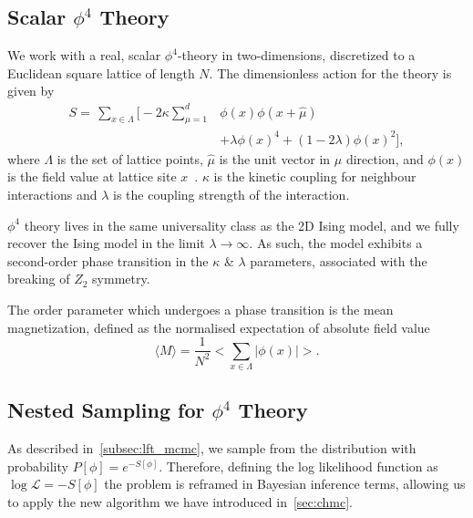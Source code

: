\documentclass[11pt]{article}
\begin{document}
\subsection{Scalar $\phi^4$ Theory}\label{subsec:phi^4_theory}
    We work with a real, scalar $\phi^4$-theory in two-dimensions, discretized to a Euclidean square lattice of length $N$.
    The dimensionless action for the theory is given by
    \begin{equation}\label{eq:phi4_action}
    \begin{aligned}
        S = \,\sum\limits_{x \in \Lambda} \Biggl[-2\kappa \sum\limits_{\mu=1}^d & \phi(x) \phi(x+\hat{\mu}) \\
        &+\lambda \phi(x)^4 + (1 - 2\lambda) \phi(x)^2 \Biggr],
    \end{aligned}
    \end{equation}
    where $\Lambda$ is the set of lattice points, $\hat{\mu}$ is the unit vector in $\mu$ direction, and $\phi(x)$ is
    the field value at lattice site $x$~\cite{maas2020lattice}. $\kappa$ is the kinetic coupling for neighbour interactions and $\lambda$ is the
    coupling strength of the interaction.

    $\phi^4$ theory lives in the same universality class as the 2D Ising model, and we fully recover the Ising model
    in the limit $\lambda \rightarrow \infty$.
    As such, the model exhibits a second-order phase transition in the $\kappa$ \& $\lambda$ parameters, associated
    with the breaking of $Z_2$ symmetry.

    The order parameter which undergoes a phase transition is the mean magnetization, defined as the normalised
    expectation of absolute field value
    \begin{equation}\label{eq:magnetization}
        \langle M \rangle = \frac{1}{N^2} \bigl< \sum_{x \in \Lambda} |\phi(x)| \bigr>.
    \end{equation}


\subsection{Nested Sampling for $\phi^4$ Theory}\label{subsec:nested-sampling-phi4}
    As described in~\ref{subsec:lft_mcmc}, we sample from the distribution with probability $P[\phi] = e^{-S[\phi]}$.
    Therefore, defining the log likelihood function as $\log{\mathcal{L}} = -S[\phi]$ the problem is reframed in
    Bayesian inference terms, allowing us to apply the new algorithm we have introduced in~\ref{sec:chmc}.
\end{document}
